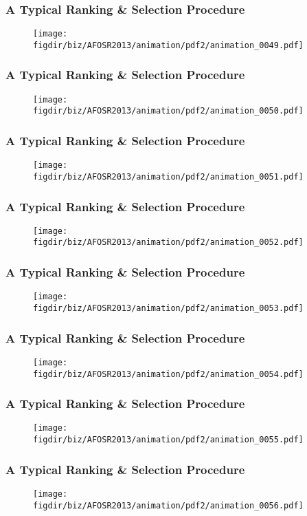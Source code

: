 \documentclass[13pt]{beamer}
\newcommand{\figdir}{../../fig}
\begin{document}
{\begin{frame}\frametitle{A Typical Ranking \& Selection Procedure}\begin{figure}\texttt{[image: \\figdir/biz/AFOSR2013/animation/pdf2/animation\_0049.pdf]}\end{figure}\end{frame}
\begin{frame}\frametitle{A Typical Ranking \& Selection Procedure}\begin{figure}\texttt{[image: \\figdir/biz/AFOSR2013/animation/pdf2/animation\_0050.pdf]}\end{figure}\end{frame}
\begin{frame}\frametitle{A Typical Ranking \& Selection Procedure}\begin{figure}\texttt{[image: \\figdir/biz/AFOSR2013/animation/pdf2/animation\_0051.pdf]}\end{figure}\end{frame}
\begin{frame}\frametitle{A Typical Ranking \& Selection Procedure}\begin{figure}\texttt{[image: \\figdir/biz/AFOSR2013/animation/pdf2/animation\_0052.pdf]}\end{figure}\end{frame}
\begin{frame}\frametitle{A Typical Ranking \& Selection Procedure}\begin{figure}\texttt{[image: \\figdir/biz/AFOSR2013/animation/pdf2/animation\_0053.pdf]}\end{figure}\end{frame}
\begin{frame}\frametitle{A Typical Ranking \& Selection Procedure}\begin{figure}\texttt{[image: \\figdir/biz/AFOSR2013/animation/pdf2/animation\_0054.pdf]}\end{figure}\end{frame}
\begin{frame}\frametitle{A Typical Ranking \& Selection Procedure}\begin{figure}\texttt{[image: \\figdir/biz/AFOSR2013/animation/pdf2/animation\_0055.pdf]}\end{figure}\end{frame}
\begin{frame}\frametitle{A Typical Ranking \& Selection Procedure}\begin{figure}\texttt{[image: \\figdir/biz/AFOSR2013/animation/pdf2/animation\_0056.pdf]}\end{figure}\end{frame}
}
\end{document}
